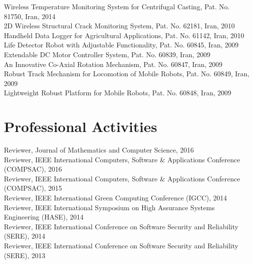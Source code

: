 \documentclass[10pt]{article}
\newlength{\Vspace}
\newlength{\Vspace}
\begin{document}
\begin{flushleft}

Wireless Temperature Monitoring System for Centrifugal Casting, Pat. No. 81750, Iran, 2014 \vspace{\Vspace} \\
2D Wireless Structural Crack Monitoring System, Pat. No. 62181, Iran, 2010 \vspace{\Vspace} \\
Handheld Data Logger for Agricultural Applications, Pat. No. 61142, Iran, 2010 \vspace{\Vspace} \\
Life Detector Robot with Adjustable Functionality, Pat. No. 60845, Iran, 2009 \vspace{\Vspace} \\
Extendable DC Motor Controller System, Pat. No. 60839, Iran, 2009 \vspace{\Vspace} \\
An Innovative Co-Axial Rotation Mechanism, Pat. No. 60847, Iran, 2009 \vspace{\Vspace} \\
Robust Track Mechanism for Locomotion of Mobile Robots, Pat. No. 60849, Iran, 2009 \vspace{\Vspace} \\
Lightweight Robust Platform for Mobile Robots, Pat. No. 60848, Iran, 2009

\end{flushleft}

\ifResume
\else
\section{Professional Activities}
\begin{flushleft}
Reviewer, Journal of Mathematics and Computer Science, 2016 \vspace{\Vspace} \\
Reviewer, IEEE International Computers, Software \& Applications Conference (COMPSAC), 2016 \vspace{\Vspace} \\
Reviewer, IEEE International Computers, Software \& Applications Conference (COMPSAC), 2015 \vspace{\Vspace} \\
Reviewer, IEEE International Green Computing Conference (IGCC), 2014 \vspace{\Vspace} \\
Reviewer, IEEE International Symposium on High Assurance Systems Engineering (HASE), 2014 \vspace{\Vspace} \\
Reviewer, IEEE International Conference on Software Security and Reliability (SERE), 2014 \vspace{\Vspace} \\
Reviewer, IEEE International Conference on Software Security and Reliability (SERE), 2013
\end{flushleft}
\fi
\end{document}
